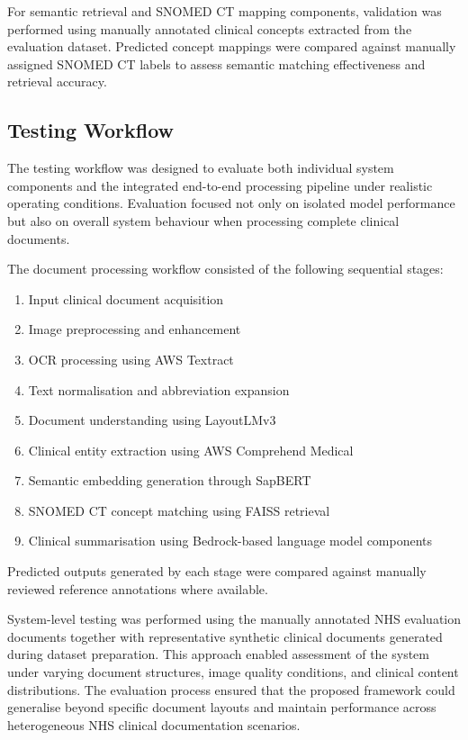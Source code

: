 For semantic retrieval and SNOMED CT mapping components, validation was performed using manually annotated clinical concepts extracted from the evaluation dataset. Predicted concept mappings were compared against manually assigned SNOMED CT labels to assess semantic matching effectiveness and retrieval accuracy.

\subsection{Testing Workflow}
The testing workflow was designed to evaluate both individual system components and the integrated end-to-end processing pipeline under realistic operating conditions. Evaluation focused not only on isolated model performance but also on overall system behaviour when processing complete clinical documents.

The document processing workflow consisted of the following sequential stages:
\begin{enumerate}
    \item Input clinical document acquisition
    \item Image preprocessing and enhancement
    \item OCR processing using AWS Textract
    \item Text normalisation and abbreviation expansion
    \item Document understanding using LayoutLMv3
    \item Clinical entity extraction using AWS Comprehend Medical
    \item Semantic embedding generation through SapBERT
    \item SNOMED CT concept matching using FAISS retrieval
    \item Clinical summarisation using Bedrock-based language model components
\end{enumerate}

Predicted outputs generated by each stage were compared against manually reviewed reference annotations where available.

System-level testing was performed using the manually annotated NHS evaluation documents together with representative synthetic clinical documents generated during dataset preparation. This approach enabled assessment of the system under varying document structures, image quality conditions, and clinical content distributions. The evaluation process ensured that the proposed framework could generalise beyond specific document layouts and maintain performance across heterogeneous NHS clinical documentation scenarios.

